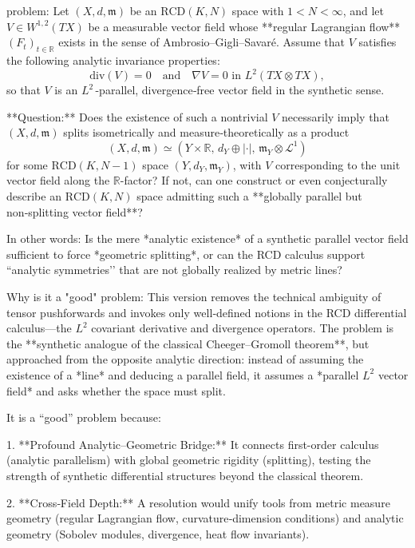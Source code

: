 problem:  
Let \((X,d,\mathfrak{m})\) be an \(\mathrm{RCD}(K,N)\) space with \(1<N<\infty\), and let \(V\in W^{1,2}(TX)\) be a measurable vector field whose **regular Lagrangian flow** \((F_t)_{t\in\mathbb{R}}\) exists in the sense of Ambrosio–Gigli–Savaré.  
Assume that \(V\) satisfies the following analytic invariance properties:
\[
\mathrm{div}(V)=0 \quad\text{and}\quad \nabla V = 0 \text{ in } L^2(T\!X\otimes T\!X),
\]
so that \(V\) is an \(L^2\)\,-parallel, divergence‑free vector field in the synthetic sense.

**Question:**  
Does the existence of such a nontrivial \(V\) necessarily imply that \((X,d,\mathfrak{m})\) splits isometrically and measure‑theoretically as a product
\[
(X,d,\mathfrak{m}) \simeq (Y\times\mathbb{R},\, d_Y\oplus |\cdot|,\, \mathfrak{m}_Y\otimes \mathcal{L}^1)
\]
for some \(\mathrm{RCD}(K,N-1)\) space \((Y,d_Y,\mathfrak{m}_Y)\),
with \(V\) corresponding to the unit vector field along the \(\mathbb{R}\)-factor?  
If not, can one construct or even conjecturally describe an \(\mathrm{RCD}(K,N)\) space admitting such a **globally parallel but non‑splitting vector field**?

In other words:  
Is the mere *analytic existence* of a synthetic parallel vector field sufficient to force *geometric splitting*, or can the RCD calculus support “analytic symmetries’’ that are not globally realized by metric lines?

Why is it a "good" problem:  
This version removes the technical ambiguity of tensor pushforwards and invokes only well‑defined notions in the RCD differential calculus—the \(L^2\) covariant derivative and divergence operators.  
The problem is the **synthetic analogue of the classical Cheeger–Gromoll theorem**, but approached from the opposite analytic direction: instead of assuming the existence of a *line* and deducing a parallel field, it assumes a *parallel \(L^2\) vector field* and asks whether the space must split.  

It is a “good” problem because:

1. **Profound Analytic–Geometric Bridge:**  
   It connects first-order calculus (analytic parallelism) with global geometric rigidity (splitting), testing the strength of synthetic differential structures beyond the classical theorem.

2. **Cross‑Field Depth:**  
   A resolution would unify tools from metric measure geometry (regular Lagrangian flow, curvature‑dimension conditions) and analytic geometry (Sobolev modules, divergence, heat flow invariants).  

